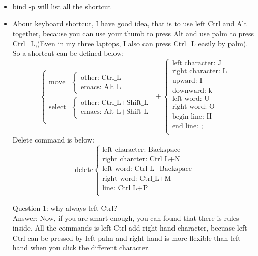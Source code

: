 \documentclass[a4paper,12pt,twoside]{book}
\begin{document}
\begin{itemize}
\item bind -p will list all the shortcut
\item  About keyboard shortcut, I have good idea, that is to use left Ctrl and Alt together, because you can use your thumb to press Alt and use palm to
	press Ctrl\_L,(Even in my three laptops, I also can press Ctrl\_L easily by palm).
	So a shortcut can be defined below:
	\[ \left\{ \begin{array}{cl}
	            \textrm{move} & \left\{ \begin{array}{c} \textrm{other: Ctrl\_L} \\ \textrm{emacs: Alt\_L} \end{array}  \right. \\
		    \textrm{select} & \left\{ \begin{array}{c} \textrm{other: Ctrl\_L+Shift\_L} \\ \textrm{emacs: Alt\_L+Shift\_L} \end{array}  \right. \\
	           \end{array} \right. + \left\{ \begin{array}{c}
						\textrm{left character: J} \\
						\textrm{right character: L}\\
						\textrm{upward: I}\\
						\textrm{downward: k}\\
						\textrm{left word: U}\\
						\textrm{right word: O} \\
						\textrm{begin line: H}\\
						\textrm{end line: ;}\\
						\end{array} \right.
	\]
	Delete command is below: \\
	\[ \textrm{delete} \left\{ \begin{array}{l}
	            \textrm{left character: Backspace}  \\
		    \textrm{right charcter: Ctrl\_L+N} \\
		     \textrm{left word: Ctrl\_L+Backspace}  \\
		    \textrm{right word: Ctrl\_L+M} \\
		     \textrm{line: Ctrl\_L+P}  \\
	           \end{array} \right.
	\]
	

	Question 1: why always left Ctrl?  \\
	Answer: Now, if you are smart enough, you can found that there is rules inside. All the commands is left Ctrl add right hand character, becuase left Ctrl can be
	pressed by left palm and right hand is more flexible than left hand when you click the different character. \\


\end{itemize}
\end{document}
